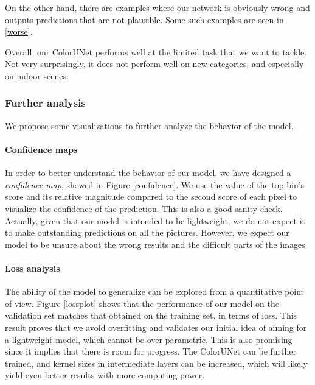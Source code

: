 \documentclass[10pt,twocolumn,letterpaper]{article}
\begin{document}
On the other hand, there are examples where our network is obviously wrong and outputs predictions that are not plausible. Some such examples are seen in \ref{worse}.

Overall, our ColorUNet performs well at the limited task that we want to tackle. Not very surprisingly, it does not perform well on new categories, and especially on indoor scenes.

\subsubsection{Further analysis}

We propose some visualizations to further analyze the behavior of the model.

\paragraph{Confidence maps}


In order to better understand the behavior of our model, we have designed a \textit{confidence map}, showed in Figure \ref{confidence}. We use the value of the top bin's score and its relative magnitude compared to the second score of each pixel to visualize the confidence of the prediction. This is also a good sanity check. Actually, given that our model is intended to be lightweight, we do not expect it to make outstanding predictions on all the pictures. However, we expect our model to be unsure about the wrong results and the difficult parts of the images.




\paragraph{Loss analysis}


The ability of the model to generalize can be explored from a quantitative point of view. Figure \ref{lossplot} shows that the performance of our model on the validation set matches that obtained on the training set, in terms of loss. This result proves that we avoid overfitting and validates our initial idea of aiming for a lightweight model, which cannot be over-parametric. This is also promising since it implies that there is room for progress. The ColorUNet can be further trained, and kernel sizes in intermediate layers can be increased, which will likely yield even better results with more computing power.
\end{document}
